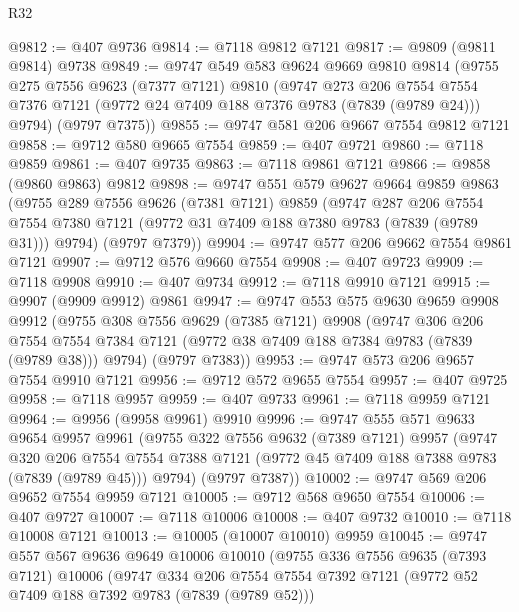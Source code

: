 \begin{lexlean}{R32}
\begin{coremodule}
@9812 := @407 @9736
@9814 := @7118 @9812 @7121
@9817 := @9809 (@9811 @9814) @9738
@9849 := @9747
    @549
    @583
    @9624
    @9669
    @9810
    @9814
    (@9755
      @275
      @7556
      @9623
      (@7377 @7121)
      @9810
      (@9747
        @273
        @206
        @7554
        @7554
        @7376
        @7121
        (@9772 @24 @7409 @188 @7376 @9783 (@7839 (@9789 @24)))
        @9794)
      (@9797 @7375))
@9855 := @9747 @581 @206 @9667 @7554 @9812 @7121
@9858 := @9712 @580 @9665 @7554
@9859 := @407 @9721
@9860 := @7118 @9859
@9861 := @407 @9735
@9863 := @7118 @9861 @7121
@9866 := @9858 (@9860 @9863) @9812
@9898 := @9747
    @551
    @579
    @9627
    @9664
    @9859
    @9863
    (@9755
      @289
      @7556
      @9626
      (@7381 @7121)
      @9859
      (@9747
        @287
        @206
        @7554
        @7554
        @7380
        @7121
        (@9772 @31 @7409 @188 @7380 @9783 (@7839 (@9789 @31)))
        @9794)
      (@9797 @7379))
@9904 := @9747 @577 @206 @9662 @7554 @9861 @7121
@9907 := @9712 @576 @9660 @7554
@9908 := @407 @9723
@9909 := @7118 @9908
@9910 := @407 @9734
@9912 := @7118 @9910 @7121
@9915 := @9907 (@9909 @9912) @9861
@9947 := @9747
    @553
    @575
    @9630
    @9659
    @9908
    @9912
    (@9755
      @308
      @7556
      @9629
      (@7385 @7121)
      @9908
      (@9747
        @306
        @206
        @7554
        @7554
        @7384
        @7121
        (@9772 @38 @7409 @188 @7384 @9783 (@7839 (@9789 @38)))
        @9794)
      (@9797 @7383))
@9953 := @9747 @573 @206 @9657 @7554 @9910 @7121
@9956 := @9712 @572 @9655 @7554
@9957 := @407 @9725
@9958 := @7118 @9957
@9959 := @407 @9733
@9961 := @7118 @9959 @7121
@9964 := @9956 (@9958 @9961) @9910
@9996 := @9747
    @555
    @571
    @9633
    @9654
    @9957
    @9961
    (@9755
      @322
      @7556
      @9632
      (@7389 @7121)
      @9957
      (@9747
        @320
        @206
        @7554
        @7554
        @7388
        @7121
        (@9772 @45 @7409 @188 @7388 @9783 (@7839 (@9789 @45)))
        @9794)
      (@9797 @7387))
@10002 := @9747 @569 @206 @9652 @7554 @9959 @7121
@10005 := @9712 @568 @9650 @7554
@10006 := @407 @9727
@10007 := @7118 @10006
@10008 := @407 @9732
@10010 := @7118 @10008 @7121
@10013 := @10005 (@10007 @10010) @9959
@10045 := @9747
    @557
    @567
    @9636
    @9649
    @10006
    @10010
    (@9755
      @336
      @7556
      @9635
      (@7393 @7121)
      @10006
      (@9747
        @334
        @206
        @7554
        @7554
        @7392
        @7121
        (@9772 @52 @7409 @188 @7392 @9783 (@7839 (@9789 @52)))

\end{coremodule}
\end{lexlean}
